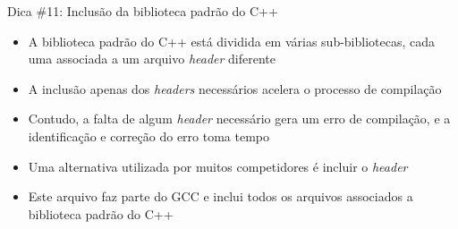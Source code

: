 \begin{frame}[fragile]{Dica \#11: Inclusão da biblioteca padrão do C++}

    \begin{itemize}
        \item A biblioteca padrão do C++ está dividida em várias sub-bibliotecas, cada uma
            associada a um arquivo \textit{header} diferente

        \item A inclusão apenas dos \textit{headers} necessários acelera o processo de
            compilação

        \item Contudo, a falta de algum \textit{header} necessário gera um erro de compilação,
            e a identificação e correção do erro toma tempo

        \item Uma alternativa utilizada por muitos competidores é incluir o \textit{header}

        \item Este arquivo faz parte do GCC e inclui todos os arquivos associados a biblioteca
            padrão do C++
    \end{itemize}

\end{frame}
